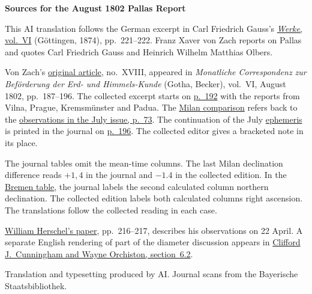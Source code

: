 \clearpage\thispagestyle{empty}
\begin{center}\textbf{Sources for the August 1802 Pallas Report}\end{center}
\noindent This AI translation follows the German excerpt in Carl Friedrich Gauss’s \href{https://gdz.sub.uni-goettingen.de/id/PPN236007467}{\textit{Werke}, vol.~VI} (Göttingen, 1874), pp.~221--222. Franz Xaver von Zach reports on Pallas and quotes Carl Friedrich Gauss and Heinrich Wilhelm Matthias Olbers.
\par\smallskip\noindent Von Zach’s \href{https://api.digitale-sammlungen.de/iiif/image/v2/bsb10538598_00195/full/1450,/0/default.jpg}{original article}, no.~XVIII, appeared in \textit{Monatliche Correspondenz zur Beförderung der Erd- und Himmels-Kunde} (Gotha, Becker), vol.~VI, August 1802, pp.~187--196. The collected excerpt starts on \href{https://api.digitale-sammlungen.de/iiif/image/v2/bsb10538598_00200/full/1450,/0/default.jpg}{p.~192} with the reports from Vilna, Prague, Kremsmünster and Padua. The \href{https://api.digitale-sammlungen.de/iiif/image/v2/bsb10538598_00201/full/1450,/0/default.jpg}{Milan comparison} refers back to the \href{https://api.digitale-sammlungen.de/iiif/image/v2/bsb10538598_00079/full/1450,/0/default.jpg}{observations in the July issue, p.~73}. The continuation of the July \href{https://api.digitale-sammlungen.de/iiif/image/v2/bsb10538598_00091/full/1450,/0/default.jpg}{ephemeris} is printed in the journal on \href{https://api.digitale-sammlungen.de/iiif/image/v2/bsb10538598_00204/full/1450,/0/default.jpg}{p.~196}. The collected editor gives a bracketed note in its place.
\par\smallskip\noindent The journal tables omit the mean-time columns. The last Milan declination difference reads \(+1{,}4\) in the journal and \(-1.4\) in the collected edition. In the \href{https://api.digitale-sammlungen.de/iiif/image/v2/bsb10538598_00202/full/1450,/0/default.jpg}{Bremen table}, the journal labels the second calculated column northern declination. The collected edition labels both calculated columns right ascension. The translations follow the collected reading in each case.
\par\smallskip\noindent \href{https://doi.org/10.1098/rstl.1802.0010}{William Herschel’s paper}, pp.~216--217, describes his observations on 22 April. A separate English rendering of part of the diameter discussion appears in \href{https://doi.org/10.1007/978-3-319-07614-0_14}{Clifford J.\ Cunningham and Wayne Orchiston, section~6.2}.
\par\smallskip\noindent Translation and typesetting produced by AI. Journal scans from the Bayerische Staatsbibliothek.
\clearpage
